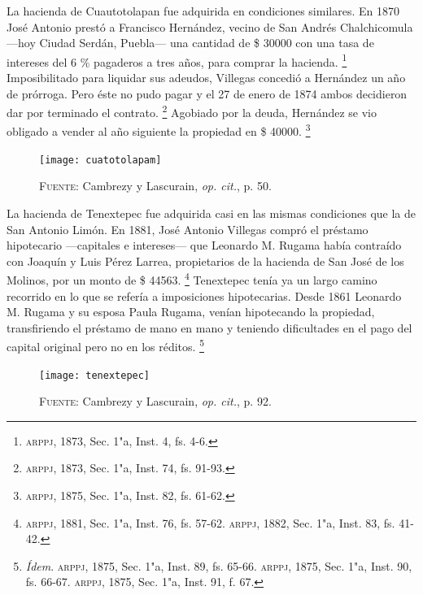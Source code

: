 \documentclass[14pt,twoside,final]{extbook} %
\let\oldfootnote\footnote
\renewcommand\footnote[1]{%
\oldfootnote{\hspace{1mm}#1}}
\begin{document}
La hacienda de Cuautotolapan fue adquirida en condiciones similares. En 1870 José Antonio prestó a Francisco Hernández, vecino de San Andrés Chalchicomula ---hoy Ciudad Serdán, Puebla--- una cantidad de \$ 30000 con una tasa de intereses del 6 \% pagaderos a tres años, para comprar la hacienda.\footnote{\textsc{arppj}, 1873, Sec. 1"a, Inst. 4, fs. 4-6.} Imposibilitado para liquidar sus adeudos, Villegas concedió a Hernández un año de prórroga. Pero éste no pudo pagar y el 27 de enero de 1874 ambos decidieron dar por terminado el contrato.\footnote{\textsc{arppj}, 1873, Sec. 1"a, Inst. 74, fs. 91-93.} Agobiado por la deuda, Hernández se vio obligado a vender al año siguiente la propiedad en \$ 40000.\footnote{\textsc{arppj}, 1875, Sec. 1"a, Inst. 82, fs. 61-62.}
\begin{figure}
\centering
\texttt{[image: cuatotolapam]}
\caption[Plano de la hacienda de Cuatotolapam]{\textsc{Fuente:} Cambrezy y Lascurain, \emph{op. cit.}, p. 50.}
\label{fig:hda-cuatotolapam}
\end{figure}

La hacienda de Tenextepec fue adquirida casi en las mismas condiciones que la de San Antonio Limón. En 1881, José Antonio Villegas compró el préstamo hipotecario ---capitales e intereses--- que Leonardo M. Rugama había contraído con Joaquín y Luis Pérez Larrea, propietarios de la hacienda de San José de los Molinos, por un monto de \$ 44563.\footnote{\textsc{arppj}, 1881, Sec. 1"a, Inst. 76, fs. 57-62. \textsc{arppj}, 1882, Sec. 1"a, Inst. 83, fs. 41-42.} Tenextepec tenía ya un largo camino recorrido en lo que se refería a imposiciones hipotecarias. Desde 1861 Leonardo M. Rugama y su esposa Paula Rugama, venían hipotecando la propiedad, transfiriendo el préstamo de mano en mano y teniendo dificultades en el pago del capital original pero no en los réditos.\footnote{\emph{Ídem}. \textsc{arppj}, 1875, Sec. 1"a, Inst. 89, fs. 65-66. \textsc{arppj}, 1875, Sec. 1"a, Inst. 90, fs. 66-67. \textsc{arppj}, 1875, Sec. 1"a, Inst. 91, f. 67.}
\begin{figure}
\centering
\texttt{[image: tenextepec]}
\caption[Plano de la hacienda de Tenextepec]{\textsc{Fuente:} Cambrezy y Lascurain, \emph{op. cit.}, p. 92.}
\label{fig:hda-tenextepec}
\end{figure}
\end{document}
